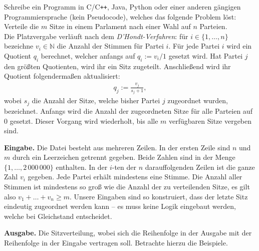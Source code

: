 \documentclass{uebung_cs}
\begin{document}
\begin{aufgabe}
  Schreibe ein Programm in C/C\texttt{++}, Java, Python oder einer anderen gängigen Programmiersprache (kein Pseudocode), welches das folgende Problem löst: 
  Verteile die $m$ Sitze in einem Parlament nach einer Wahl auf $n$ Parteien.\\[0.25cm]
  Die Platzvergabe verläuft nach dem \emph{D'Hondt-Verfahren}:
  für $i \in \{1, \dots, n\}$ bezeichne $v_i \in \mathbb N$ die Anzahl der Stimmen für Partei $i$.
  Für jede Partei $i$ wird ein Quotient $q_i$ berechnet, welcher anfangs auf $q_i := v_i/1$ gesetzt wird.
  Hat Partei $j$ den größten Quotienten, wird ihr ein Sitz zugeteilt.
  Anschließend wird ihr Quotient folgendermaßen aktualisiert:
  \begin{align*}
      q_j := \frac{v_j}{s_j + 1},
  \end{align*}
  wobei $s_j$ die Anzahl der Sitze, welche bisher Partei $j$ zugeordnet wurden, bezeichnet.
  Anfangs wird die Anzahl der zugeordneten Sitze für alle Parteien auf $0$ gesetzt.
  Dieser Vorgang wird wiederholt, bis alle $m$ verfügbaren Sitze vergeben sind.
  
  \textbf{Eingabe.}
  Die Datei besteht aus mehreren Zeilen.
  In der ersten Zeile sind $n$ und $m$ durch ein Leerzeichen getrennt gegeben.
  Beide Zahlen sind in der Menge $\{1, \dots, 2\,000\,000\}$ enthalten.
  In der $i$-ten der $n$ darauffolgenden Zeilen ist die ganze Zahl $v_i$ gegeben.
  Jede Partei erhält mindestens eine Stimme.
  Die Anzahl aller Stimmen ist mindestens so groß wie die Anzahl der zu verteilenden Sitze, es gilt also $v_1 + \dots + v_n \geq m$.
  Unsere Eingaben sind so konstruiert, dass der letzte Sitz eindeutig zugeordnet werden kann -- es muss keine Logik eingebaut werden, welche bei Gleichstand entscheidet.
  
  \textbf{Ausgabe.}
  Die Sitzverteilung, wobei sich die Reihenfolge in der Ausgabe mit der Reihenfolge in der Eingabe vertragen soll. Betrachte hierzu die Beispiele.
  

\end{aufgabe}
\end{document}
